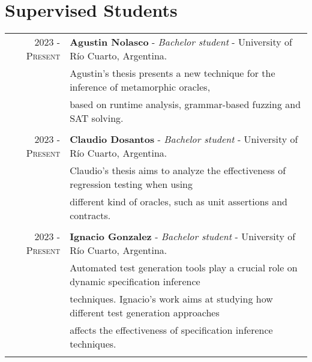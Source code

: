 \documentclass[a4paper,10pt]{article} %
\begin{document}
\section{Supervised Students}
\begin{longtable}{rl}

\textsc{2023 - Present} & \textbf{Agustin Nolasco} - \textit{Bachelor student} - University of Río Cuarto, Argentina. \\ 
& Agustin's thesis presents a new technique for the inference of metamorphic oracles, \\ 
& based on runtime analysis, grammar-based fuzzing and SAT solving. \\ & \\

\textsc{2023 - Present} & \textbf{Claudio Dosantos} - \textit{Bachelor student} - University of Río Cuarto, Argentina. \\
& Claudio's thesis aims to analyze the effectiveness of regression testing when using \\ 
& different kind of oracles, such as unit assertions and contracts. \\ & \\

\textsc{2023 - Present} & \textbf{Ignacio Gonzalez} - \textit{Bachelor student} - University of Río Cuarto, Argentina. \\
& Automated test generation tools play a crucial role on dynamic specification inference \\ 
& techniques. Ignacio's work aims at studying how different test generation approaches \\ 
& affects the effectiveness of specification inference techniques. \\ & \\

\end{longtable}
\end{document}
